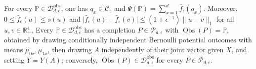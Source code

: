 For every \(\mathbb P\in\mathcal D_{d,\epsilon}^{\mathrm{obs}}\), one has \(q_x\in\mathcal C_\epsilon\) and \(\Psi(\mathbb P)=\sum_{x=1}^d\bar f_\epsilon(q_x)\).  Moreover, \(0\leq\bar f_\epsilon(u)\leq s(u)\) and \(\lvert\bar f_\epsilon(u)-\bar f_\epsilon(v)\rvert\leq(1+\epsilon^{-1})\lVert u-v\rVert_1\) for all \(u,v\in\mathbb R_+^4\).  Every \(\mathbb P\in\mathcal D_{d,\epsilon}^{\mathrm{obs}}\) has a completion \(P\in\mathcal P_{d,\epsilon}\) with \(\operatorname{Obs}(P)=\mathbb P\), obtained by drawing conditionally independent Bernoulli potential outcomes with means \(\mu_{0x},\mu_{1x}\), then drawing \(A\) independently of their joint vector given \(X\), and setting \(Y=Y(A)\); conversely, \(\operatorname{Obs}(P)\in\mathcal D_{d,\epsilon}^{\mathrm{obs}}\) for every \(P\in\mathcal P_{d,\epsilon}\).